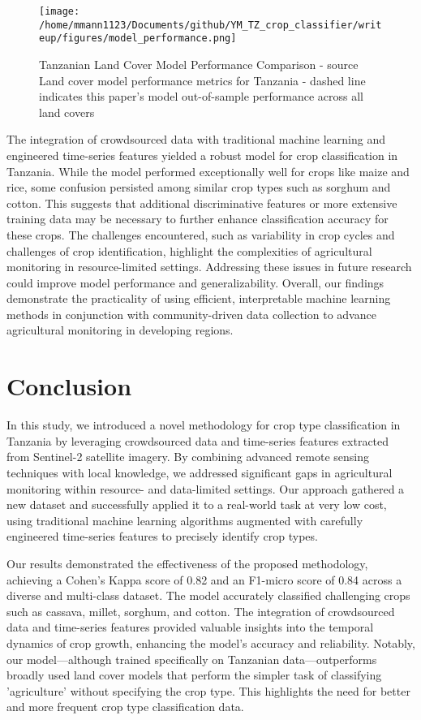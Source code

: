 \documentclass[journal]{IEEEtran}
\begin{document}
\begin{figure}[!t]
  \centering
  \texttt{[image: /home/mmann1123/Documents/github/YM\_TZ\_crop\_classifier/writeup/figures/model\_performance.png]}  
    \caption{Tanzanian Land Cover Model Performance Comparison - source \cite{kerner2024accurate} \newline Land cover model performance metrics for Tanzania - dashed line indicates this paper’s model out-of-sample performance across all land covers }
    \label{fig:model_compare} %
\end{figure} 

The integration of crowdsourced data with traditional machine learning and engineered time-series features yielded a robust model for crop classification in Tanzania. While the model performed exceptionally well for crops like maize and rice, some confusion persisted among similar crop types such as sorghum and cotton. This suggests that additional discriminative features or more extensive training data may be necessary to further enhance classification accuracy for these crops. The challenges encountered, such as variability in crop cycles and challenges of crop identification, highlight the complexities of agricultural monitoring in resource-limited settings. Addressing these issues in future research could improve model performance and generalizability. Overall, our findings demonstrate the practicality of using efficient, interpretable machine learning methods in conjunction with community-driven data collection to advance agricultural monitoring in developing regions.

\section{Conclusion}
In this study, we introduced a novel methodology for crop type classification in Tanzania by leveraging crowdsourced data and time-series features extracted from Sentinel-2 satellite imagery. By combining advanced remote sensing techniques with local knowledge, we addressed significant gaps in agricultural monitoring within resource- and data-limited settings. Our approach gathered a new dataset and successfully applied it to a real-world task at very low cost, using traditional machine learning algorithms augmented with carefully engineered time-series features to precisely identify crop types.

Our results demonstrated the effectiveness of the proposed methodology, achieving a Cohen's Kappa score of 0.82 and an F1-micro score of 0.84 across a diverse and multi-class dataset. The model accurately classified challenging crops such as cassava, millet, sorghum, and cotton. The integration of crowdsourced data and time-series features provided valuable insights into the temporal dynamics of crop growth, enhancing the model's accuracy and reliability. Notably, our model—although trained specifically on Tanzanian data—outperforms broadly used land cover models that perform the simpler task of classifying 'agriculture' without specifying the crop type. This highlights the need for better and more frequent crop type classification data.
\end{document}
